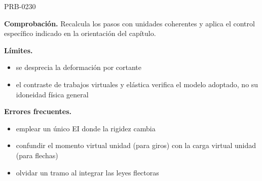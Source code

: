 \begin{studiumworked}{PRB-0230}
\par\textbf{Comprobación.} Recalcula los pasos con unidades coherentes y aplica el control específico indicado en la orientación del capítulo.

\textbf{Límites.}\begin{itemize}\item se desprecia la deformación por cortante
\item el contraste de trabajos virtuales y elástica verifica el modelo adoptado, no su idoneidad física general\end{itemize}

\textbf{Errores frecuentes.}\begin{itemize}\item emplear un único EI donde la rigidez cambia
\item confundir el momento virtual unidad (para giros) con la carga virtual unidad (para flechas)
\item olvidar un tramo al integrar las leyes flectoras\end{itemize}

\end{studiumworked}

\Needspace{.3\textheight}

